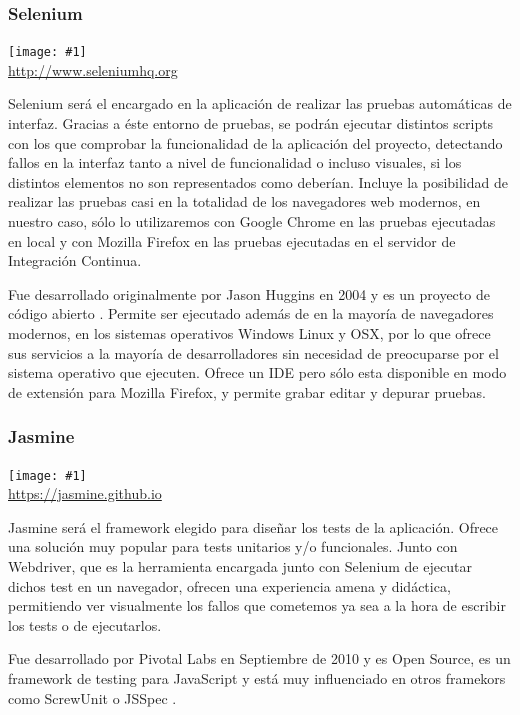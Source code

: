 \documentclass[11pt,openany]{book}
\newcommand{\logo}[2]{\medskip\begin{center}\texttt{[image: \#1]}\\\scriptsize\url{#2}\end{center}\bigskip}
\begin{document}
\subsubsection{Selenium}

\logo{logos/selenium.png}{http://www.seleniumhq.org}

Selenium será el encargado en la aplicación de realizar las pruebas automáticas de interfaz. Gracias a éste entorno de pruebas, se podrán ejecutar distintos scripts con los que comprobar la funcionalidad de la aplicación del proyecto, detectando fallos en la interfaz tanto a nivel de funcionalidad o incluso visuales, si los distintos elementos no son representados como deberían. Incluye la posibilidad de realizar las pruebas casi en la totalidad de los navegadores web modernos, en nuestro caso, sólo lo utilizaremos con Google Chrome en las pruebas ejecutadas en local y con Mozilla Firefox en las pruebas ejecutadas en el servidor de Integración Continua.

Fue desarrollado originalmente por Jason Huggins en 2004 y es un proyecto de código abierto \cite{9}. Permite ser ejecutado además de en la mayoría de navegadores modernos, en los sistemas operativos Windows Linux y OSX, por lo que ofrece sus servicios a la mayoría de desarrolladores sin necesidad de preocuparse por el sistema operativo que ejecuten. Ofrece un IDE pero sólo esta disponible en modo de extensión para Mozilla Firefox, y permite grabar editar y depurar pruebas.

\subsubsection{Jasmine}

\logo{logos/jasmine.png}{https://jasmine.github.io}

Jasmine será el framework elegido para diseñar los tests de la aplicación. Ofrece una solución muy popular para tests unitarios y/o funcionales. Junto con Webdriver, que es la herramienta encargada junto con Selenium de ejecutar dichos test en un navegador, ofrecen una experiencia amena y didáctica, permitiendo ver visualmente los fallos que cometemos ya sea a la hora de escribir los tests o de ejecutarlos.

Fue desarrollado por Pivotal Labs en Septiembre de 2010 y es Open Source, es un framework de testing para JavaScript y está muy influenciado en otros framekors como ScrewUnit o JSSpec \cite{10}.
\end{document}
